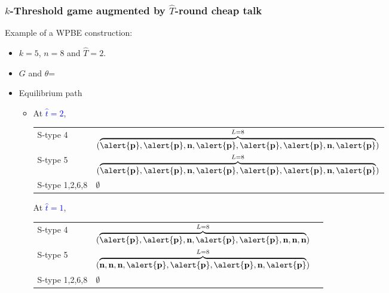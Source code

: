 \documentclass[8pt]{beamer}
\begin{document}
\begin{frame}
  \frametitle{$k$-Threshold game augmented by $\hat{T}$-round cheap talk}
Example of a WPBE construction:
\begin{itemize}
\item $k=5$, $n=8$ and $\hat{T}=2$.
\item $G$ and $\theta$=
\begin{center}
\end{center}
\end{itemize}

\begin{itemize}
\item Equilibrium path
\begin{itemize}
\item 
{}
{
At \textcolor{blue}{$\hat{t}=2$}, 
\begin{table}[h]
\begin{tabular}{ll }
S-type 4 & $(\overbrace{\alert{\textbf{p}},\alert{\textbf{p}},\textbf{n},\alert{\textbf{p}},\alert{\textbf{p}},\alert{\textbf{p}},\textbf{n},\alert{\textbf{p}}}^{L=8})$\\
S-type 5 & $(\overbrace{\alert{\textbf{p}},\alert{\textbf{p}},\textbf{n},\alert{\textbf{p}},\alert{\textbf{p}},\alert{\textbf{p}},\textbf{n},\alert{\textbf{p}}}^{L=8})$\\
S-type 1,2,6,8 & $\emptyset$
\end{tabular}
\end{table}
}
{
At \textcolor{blue}{$\hat{t}=1$}, 
\begin{table}[h]
\begin{tabular}{ll l}
S-type 4 & $(\overbrace{\alert{\textbf{p}},\alert{\textbf{p}},\textbf{n},\alert{\textbf{p}},\alert{\textbf{p}},\textbf{n},\textbf{n},\textbf{n}}^{L=8})$\\
S-type 5 & $(\overbrace{\textbf{n},\textbf{n},\textbf{n},\alert{\textbf{p}},\alert{\textbf{p}},\alert{\textbf{p}},\textbf{n},\alert{\textbf{p}}}^{L=8})$ \\
S-type 1,2,6,8 & $\emptyset$
\end{tabular}
\end{table}
}


\end{itemize}
\end{itemize}
\end{frame}
\end{document}

